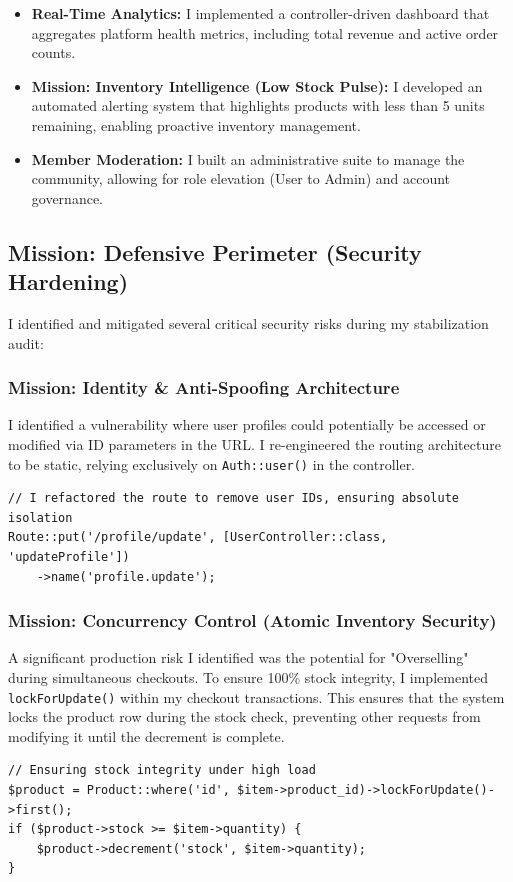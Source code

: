 \documentclass[12pt,a4paper]{article}
\begin{document}
\begin{itemize}
    \item \textbf{Real-Time Analytics:} I implemented a controller-driven dashboard that aggregates platform health metrics, including total revenue and active order counts.
    \item \textbf{Mission: Inventory Intelligence (Low Stock Pulse):} I developed an automated alerting system that highlights products with less than 5 units remaining, enabling proactive inventory management.
    \item \textbf{Member Moderation:} I built an administrative suite to manage the community, allowing for role elevation (User to Admin) and account governance.
\end{itemize}

\subsection{Mission: Defensive Perimeter (Security Hardening)}
I identified and mitigated several critical security risks during my stabilization audit:

\subsubsection{Mission: Identity \& Anti-Spoofing Architecture}
I identified a vulnerability where user profiles could potentially be accessed or modified via ID parameters in the URL. I re-engineered the routing architecture to be static, relying exclusively on \texttt{Auth::user()} in the controller.
\begin{lstlisting}
// I refactored the route to remove user IDs, ensuring absolute isolation
Route::put('/profile/update', [UserController::class, 'updateProfile'])
    ->name('profile.update');
\end{lstlisting}

\subsubsection{Mission: Concurrency Control (Atomic Inventory Security)}
A significant production risk I identified was the potential for "Overselling" during simultaneous checkouts. To ensure 100\% stock integrity, I implemented \texttt{lockForUpdate()} within my checkout transactions. This ensures that the system locks the product row during the stock check, preventing other requests from modifying it until the decrement is complete.
\begin{lstlisting}
// Ensuring stock integrity under high load
$product = Product::where('id', $item->product_id)->lockForUpdate()->first();
if ($product->stock >= $item->quantity) {
    $product->decrement('stock', $item->quantity);
}
\end{lstlisting}
\end{document}
